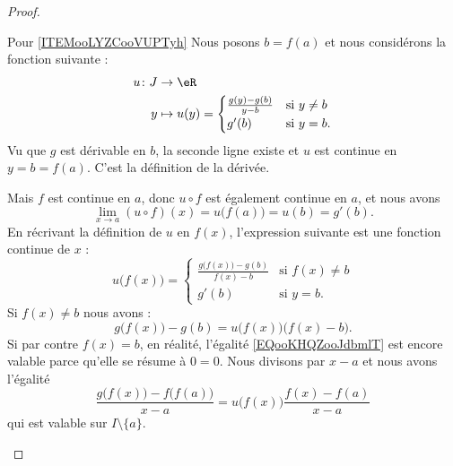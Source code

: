 \begin{proof}
\begin{subproof}
        \item[Pour \ref{ITEMooLYZCooVUPTyh}]
            Nous posons \( b=f(a)\) et nous considérons la fonction suivante :
            \begin{equation}
                \begin{aligned}
                    u\colon J&\to \eR \\
                    y&\mapsto u(y)=\begin{cases}
                        \frac{ g(y)-g(b) }{ y-b }    &   \text{si } y\neq b\\
                        g'(b)    &    \text{si } y=b.
                    \end{cases}
                \end{aligned}
            \end{equation}
            Vu que \( g\) est dérivable en \( b\), la seconde ligne existe et \( u\) est continue en \( y=b=f(a)\). C'est la définition de la dérivée. 

            Mais \( f\) est continue en \( a\), donc \( u\circ f\) est également continue en \( a\), et nous avons
            \begin{equation}
                \lim_{x\to a} (u\circ f)(x)=u\big( f(a) \big)=u(b)=g'(b).
            \end{equation}
            En récrivant la définition de \( u\) en \( f(x)\), l'expression suivante est une fonction continue de \( x\) :
            \begin{equation}
                u\big( f(x) \big)=\begin{cases}
                    \frac{ g\big( f(x) \big)-g(b) }{ f(x)-b }    &   \text{si } f(x)\neq b\\
                    g'(b)    &    \text{si } y=b.
                \end{cases}
            \end{equation}
            Si \( f(x)\neq b\) nous avons :
            \begin{equation}        \label{EQooKHQZooJdbmlT}
                g\big( f(x) \big)-g(b)=u\big( f(x) \big)\big( f(x)-b \big).
            \end{equation}
            Si par contre \( f(x)=b\), en réalité, l'égalité \eqref{EQooKHQZooJdbmlT} est encore valable parce qu'elle se résume à \( 0=0\). Nous divisons par \( x-a\) et nous avons l'égalité
            \begin{equation}
                \frac{ g\big( f(x) \big)-f\big( f(a) \big) }{ x-a }=u\big( f(x) \big)\frac{ f(x)-f(a) }{ x-a }
            \end{equation}
            qui est valable sur \( I\setminus\{ a \}\).


\end{subproof}
\end{proof}
